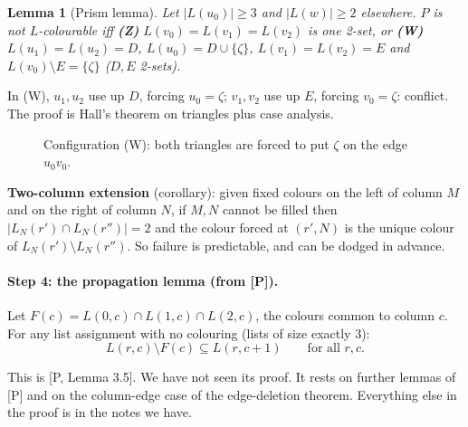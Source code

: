 \documentclass[11pt]{article}
\theoremstyle{plain}
\newtheorem{lemma}[theorem]{Lemma}
\theoremstyle{definition}
\begin{document}
\begin{lemma}[Prism lemma]
Let $|L(u_0)|\ge3$ and $|L(w)|\ge2$ elsewhere. $P$ is not $L$-colourable iff
\textbf{(Z)} $L(v_0)=L(v_1)=L(v_2)$ is one 2-set, or
\textbf{(W)} $L(u_1)=L(u_2)=D$, $L(u_0)=D\cup\{\zeta\}$, $L(v_1)=L(v_2)=E$ and
$L(v_0)\setminus E=\{\zeta\}$ ($D,E$ 2-sets).
\end{lemma}
In (W), $u_1,u_2$ use up $D$, forcing $u_0=\zeta$; $v_1,v_2$ use up $E$, forcing $v_0=\zeta$:
conflict. The proof is Hall's theorem on triangles plus case analysis.

\begin{figure}[ht]\centering
{}
\caption{Configuration (W): both triangles are forced to put $\zeta$ on the edge $u_0v_0$.}
\end{figure}

\textbf{Two-column extension} (corollary): given fixed colours on the left of column $M$ and
on the right of column $N$, if $M,N$ cannot be filled then $|L_N(r')\cap L_N(r'')|=2$ and the
colour forced at $(r',N)$ is the unique colour of $L_N(r')\setminus L_N(r'')$. So failure is
predictable, and can be dodged in advance.

\paragraph{Step 4: the propagation lemma (from [P]).}
Let $F(c)=L(0,c)\cap L(1,c)\cap L(2,c)$, the colours common to column $c$. For any list
assignment with no colouring (lists of size exactly 3):
\[
L(r,c)\setminus F(c)\subseteq L(r,c+1)\qquad\text{for all } r,c. \tag{$\ast$}
\]
\begin{status}
This is [P, Lemma 3.5]. We have not seen its proof. It rests on further lemmas of [P] and on
the column-edge case of the edge-deletion theorem. Everything else in the proof is in the notes
we have.
\end{status}
\end{document}
